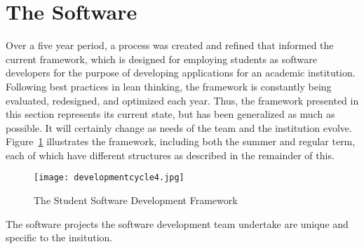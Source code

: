 \section{The Software}
Over a five year period, a process was created and refined that informed the current framework, which is designed for employing students as software developers for the purpose of developing applications for an academic institution. Following best practices in lean thinking, the framework is constantly being evaluated, redesigned, and optimized each year. Thus, the framework presented in this section represents its current state, but has been generalized as much as possible. It will certainly change as needs of the team and the institution evolve. Figure~\ref{fig:framework} illustrates the framework, including both the summer and regular term, each of which have different structures as described in the remainder of this.

\begin{figure}[htbp]
 \centering
 \texttt{[image: developmentcycle4.jpg]}
 \caption{The Student Software Development Framework}
 \label{fig:framework}
\end{figure}

The software projects the software development team undertake are unique and specific to the insitution.

